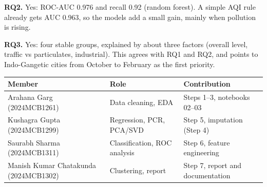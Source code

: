 \documentclass[10pt,a4paper]{article}
\begin{document}
\textbf{RQ2.} Yes: ROC-AUC 0.976 and recall 0.92 (random forest). A simple AQI rule already gets AUC 0.963, so the models add a small gain, mainly when pollution is rising.

\textbf{RQ3.} Yes: four stable groups, explained by about three factors (overall level, traffic vs particulates, industrial). This agrees with RQ1 and RQ2, and points to Indo-Gangetic cities from October to February as the first priority.

{\centering\small
\begin{tabular}{lll}\toprule
Member & Role & Contribution\\\midrule
Arahana Garg (2024MCB1261) & Data cleaning, EDA & Steps 1--3, notebooks 02--03\\
Kushagra Gupta (2024MCB1299) & Regression, PCR, PCA/SVD & Step 5, imputation (Step 4)\\
Saurabh Sharma (2024MCB1311) & Classification, ROC analysis & Step 6, feature engineering\\
Manish Kumar Chatakunda (2024MCB1302) & Clustering, report & Step 7, report and documentation\\\bottomrule
\end{tabular}
\par}

\end{document}
